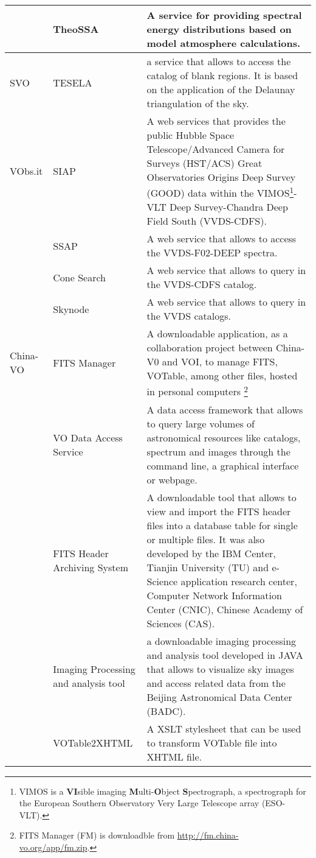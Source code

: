 \begin{table*}[h!t]
\begin{tabular}{|l|l|p{12.5cm}|}
			& TheoSSA & A service for providing spectral energy distributions based on model atmosphere calculations.\\
	\hline		
	SVO		& TESELA & a service that allows to access the catalog of blank regions. It is based on the application of the Delaunay triangulation
									 of the sky. \\
	\hline								 
	VObs.it	& SIAP & A web services that provides the public Hubble Space Telescope/Advanced Camera for Surveys (HST/ACS) Great Observatories Origins 
									Deep Survey (GOOD) data within the VIMOS\footnote{VIMOS is a \textbf{VI}sible imaging \textbf{M}ulti-\textbf{O}bject 
									\textbf{S}pectrograph, a spectrograph for the European Southern Observatory Very Large Telescope array (ESO-VLT).}-VLT
									Deep Survey-Chandra Deep Field South (VVDS-CDFS).\\
			& SSAP & A web service that allows to access the VVDS-F02-DEEP spectra. \\
			& Cone Search & A web service that allows to query in the VVDS-CDFS catalog.  \\
			& Skynode & A web service that allows to query in the VVDS catalogs. \\
	\hline		
	China-VO& FITS Manager & A downloadable application, as a collaboration project between China-V0 and VOI, to manage FITS, VOTable, among other files, 
								hosted in personal computers \footnote{FITS Manager (FM) is downloadble from \url{http://fm.china-vo.org/app/fm.zip}.}  \\
			& VO Data Access Service & A data access framework that allows to query large volumes of astronomical resources like catalogs, spectrum 
									and images through the command line, a graphical interface or webpage.\\
			& FITS Header Archiving System & A downloadable tool that allows to view and import the FITS header files into a database table for single or 
									multiple files. It was also developed by the IBM Center, Tianjin University (TU) and e-Science application research 
									center, Computer Network Information Center (CNIC), Chinese Academy of Sciences (CAS).\\
			& Imaging Processing and analysis tool & a downloadable imaging processing and analysis tool developed in JAVA that allows to visualize sky 
									images and access related data from the Beijing Astronomical Data Center (BADC). \\
			& VOTable2XHTML & A XSLT stylesheet that can be used to transform VOTable file into XHTML file.\\

\end{tabular}
\end{table*}
